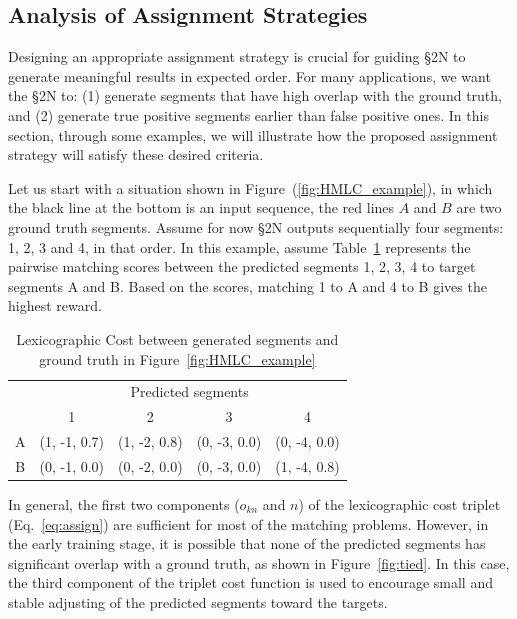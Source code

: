 \documentclass[10pt,journal,compsoc]{IEEEtran}
\begin{document}
\subsection{Analysis\label{sec:analysis} of Assignment Strategies}
Designing an appropriate assignment strategy is crucial for guiding \S2N to generate meaningful results in expected order. For many applications, we want the \S2N to: (1) generate segments that have high overlap with the ground truth, and (2) generate true positive segments earlier than false positive ones. In this section, through some examples, we will illustrate how the proposed assignment strategy will satisfy these desired criteria. 

Let us start with a situation shown in Figure~(\ref{fig:HMLC_example}), in which the black line at the bottom is an input sequence, the red lines $A$ and $B$ are two ground truth segments. Assume for now \S2N outputs sequentially four segments: 1, 2, 3 and 4, in that order. In this example, assume Table~\ref{tab:HMLC} represents the pairwise matching scores between the predicted segments 1, 2, 3, 4 to target segments A and B. Based on the scores, matching 1 to A and 4 to B gives the highest reward. 



\setlength{\tabcolsep}{8pt}
\begin{table}
 \centering
 \begin{tabular}{c  c  c  c c}
 \toprule
& \multicolumn{4}{c}{Predicted segments} \\
\cmidrule{2-5}
   &  1 &  2 & 3 & 4   \\
\midrule 
 A &  (1, -1, 0.7) & (1, -2, 0.8) & (0, -3, 0.0) & (0, -4, 0.0)  \\
 B &  (0, -1, 0.0) & (0, -2, 0.0) & (0, -3, 0.0) & (1, -4, 0.8) \\ 
 \bottomrule
 \end{tabular}
 \caption{Lexicographic Cost between generated segments and ground truth in Figure~\ref{fig:HMLC_example}\label{tab:HMLC}}
 \end{table}


In general, the first two components ($o_{kn}$ and $n$) of the lexicographic cost triplet (Eq.~\ref{eq:assign}) are sufficient for most of the matching problems. However, in the early training stage, it is possible that none of the predicted segments has significant overlap with a ground truth, as shown in Figure~\ref{fig:tied}. In this case, the third component of the triplet cost function is used to encourage small and stable adjusting of the predicted segments toward the targets. 
\end{document}
